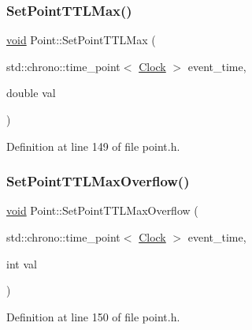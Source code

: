 \subsubsection{\texorpdfstring{Set\+Point\+T\+T\+L\+Max()}{SetPointTTLMax()}}
{\footnotesize\ttfamily \mbox{\hyperlink{glad_8h_a950fc91edb4504f62f1c577bf4727c29}{void}} Point\+::\+Set\+Point\+T\+T\+L\+Max (\begin{DoxyParamCaption}\item[{std\+::chrono\+::time\+\_\+point$<$ \mbox{\hyperlink{universe_8h_a0ef8d951d1ca5ab3cfaf7ab4c7a6fd80}{Clock}} $>$}]{event\+\_\+time,  }\item[{double}]{val }\end{DoxyParamCaption})\hspace{0.3cm}{\ttfamily [inline]}}



Definition at line 149 of file point.\+h.

\mbox{\label{class_point_a6a7ca43c551232d5c5d0f5a5d8603c9e}} 
\subsubsection{\texorpdfstring{Set\+Point\+T\+T\+L\+Max\+Overflow()}{SetPointTTLMaxOverflow()}}
{\footnotesize\ttfamily \mbox{\hyperlink{glad_8h_a950fc91edb4504f62f1c577bf4727c29}{void}} Point\+::\+Set\+Point\+T\+T\+L\+Max\+Overflow (\begin{DoxyParamCaption}\item[{std\+::chrono\+::time\+\_\+point$<$ \mbox{\hyperlink{universe_8h_a0ef8d951d1ca5ab3cfaf7ab4c7a6fd80}{Clock}} $>$}]{event\+\_\+time,  }\item[{int}]{val }\end{DoxyParamCaption})\hspace{0.3cm}{\ttfamily [inline]}}



Definition at line 150 of file point.\+h.

\mbox{\label{class_point_ae36f75ff4e27742000acd8cad7743614}} 
